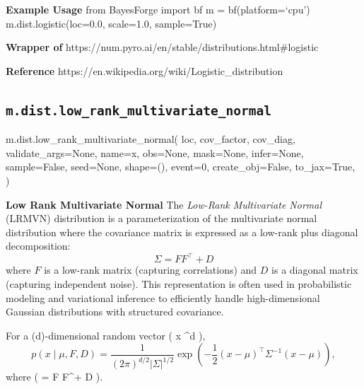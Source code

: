 \documentclass[
  letterpaper,
  DIV=11,
  numbers=noendperiod]{scrartcl}
\newenvironment{Shaded}{\begin{snugshade}}{\end{snugshade}}
\newcommand{\DecValTok}[1]{\textcolor[rgb]{0.68,0.00,0.00}{#1}}
\newcommand{\NormalTok}[1]{\textcolor[rgb]{0.00,0.23,0.31}{#1}}
\newcommand{\OperatorTok}[1]{\textcolor[rgb]{0.37,0.37,0.37}{#1}}
\newcommand{\StringTok}[1]{\textcolor[rgb]{0.13,0.47,0.30}{#1}}
\newcommand{\VariableTok}[1]{\textcolor[rgb]{0.07,0.07,0.07}{#1}}
\begin{document}
\textbf{Example Usage} from BayesForge import bf m = bf(platform=`cpu')
m.dist.logistic(loc=0.0, scale=1.0, sample=True)

\textbf{Wrapper of}
https://num.pyro.ai/en/stable/distributions.html\#logistic

\textbf{Reference} https://en.wikipedia.org/wiki/Logistic\_distribution

\subsection{\texorpdfstring{\texttt{m.dist.low\_rank\_multivariate\_normal}}{m.dist.low\_rank\_multivariate\_normal}}\label{low_rank_multivariate_normal}

\begin{Shaded}
\begin{Highlighting}[]
\NormalTok{m.dist.low\_rank\_multivariate\_normal(}
\NormalTok{    loc,}
\NormalTok{    cov\_factor,}
\NormalTok{    cov\_diag,}
\NormalTok{    validate\_args}\OperatorTok{=}\VariableTok{None}\NormalTok{,}
\NormalTok{    name}\OperatorTok{=}\StringTok{\textquotesingle{}x\textquotesingle{}}\NormalTok{,}
\NormalTok{    obs}\OperatorTok{=}\VariableTok{None}\NormalTok{,}
\NormalTok{    mask}\OperatorTok{=}\VariableTok{None}\NormalTok{,}
\NormalTok{    infer}\OperatorTok{=}\VariableTok{None}\NormalTok{,}
\NormalTok{    sample}\OperatorTok{=}\VariableTok{False}\NormalTok{,}
\NormalTok{    seed}\OperatorTok{=}\VariableTok{None}\NormalTok{,}
\NormalTok{    shape}\OperatorTok{=}\NormalTok{(),}
\NormalTok{    event}\OperatorTok{=}\DecValTok{0}\NormalTok{,}
\NormalTok{    create\_obj}\OperatorTok{=}\VariableTok{False}\NormalTok{,}
\NormalTok{    to\_jax}\OperatorTok{=}\VariableTok{True}\NormalTok{,}
\NormalTok{)}
\end{Highlighting}
\end{Shaded}

\textbf{Low Rank Multivariate Normal} The \emph{Low-Rank Multivariate
Normal} (LRMVN) distribution is a parameterization of the multivariate
normal distribution where the covariance matrix is expressed as a
low-rank plus diagonal decomposition: \[
\Sigma = F F^\top + D
\] where \(F\) is a low-rank matrix (capturing correlations) and \(D\)
is a diagonal matrix (capturing independent noise). This representation
is often used in probabilistic modeling and variational inference to
efficiently handle high-dimensional Gaussian distributions with
structured covariance.

For a (d)-dimensional random vector ( x \in {}\^{}d ), \[
p(x \mid \mu, F, D) = \frac{1}{(2\pi)^{d/2} |\Sigma|^{1/2}}
\exp\left(-\frac{1}{2}(x - \mu)^\top \Sigma^{-1} (x - \mu)\right),
\] where ( \Sigma = F F\^{}\top + D ).
\end{document}
